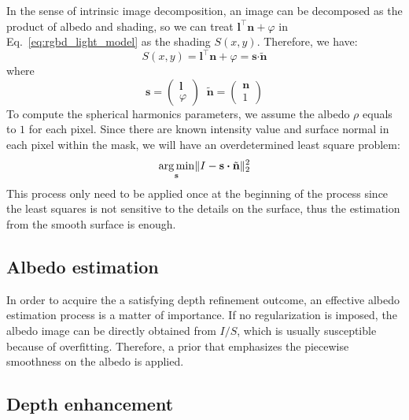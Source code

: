 In the sense of intrinsic image decomposition, an image can be decomposed as the product of albedo and shading, so we can treat $\mathbf{l}^\top \mathbf{n} + \varphi$ in Eq.~\ref{eq:rgbd_light_model} as the shading $S(x,y)$.
Therefore, we have:
\begin{equation}
S(x,y) = \mathbf{l}^\top \mathbf{n} + \varphi = \mathbf{s} \boldsymbol{\cdot} \tilde{\mathbf{n}}
\end{equation}
where
\begin{equation}
\mathbf{s} = \begin{pmatrix}\mathbf{l} \\ \varphi \end{pmatrix}   \; \; \tilde{\mathbf{n}} = \begin{pmatrix}\mathbf{n} \\ 1\end{pmatrix}  
\end{equation}
To compute the spherical harmonics parameters, we assume the albedo $\rho$ equals to $1$ for each pixel. 
Since there are known intensity value and surface normal in each pixel within the mask, we will have an overdetermined least square problem: 
\begin{equation}
\operatorname*{arg\,min}_{\mathbf{s}} \lVert I - \mathbf{s} \boldsymbol{\cdot} \tilde{\mathbf{n}} \rVert^2_2
\end{equation}
This process only need to be applied once at the beginning of the process since the least squares is not sensitive to the details on the surface, thus the estimation from the smooth surface is enough.

\subsection{Albedo estimation}
In order to acquire the a satisfying depth refinement outcome, an effective albedo estimation process is a matter of importance.
If no regularization is imposed, the albedo image can be directly obtained from $I/S$, which is usually susceptible because of overfitting. 
Therefore, a prior that emphasizes the piecewise smoothness on the albedo is applied.

\subsection{Depth enhancement}

